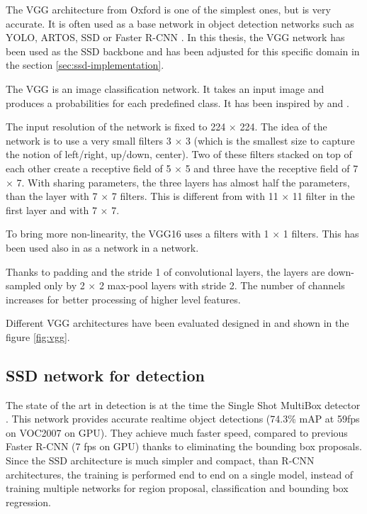 \documentclass[a4paper,12pt,titlepage, twoside]{article}
\numberwithin{figure}{section}
\begin{document}
The VGG\cite{simonyan2014very} architecture from Oxford is one of the simplest ones, but is very accurate. It is often used as a base network in object detection networks such as YOLO\cite{redmon2016you}, ARTOS\cite{barz2017fast}, SSD \cite{liu2016ssd} or Faster R-CNN \cite{faster-rcnn}. In this thesis, the VGG network has been used as the SSD backbone and has been adjusted for this specific domain in the section \ref{sec:ssd-implementation}. 

The VGG is an image classification network. It takes an input image and produces a probabilities for each predefined class. It has been inspired by \cite{ciresan2011flexible} and \cite{krizhevsky2012imagenet}.

The input resolution of the network is fixed to 224 $\times$ 224. The idea of the network is to use a very small filters 3 $\times$ 3  (which is the smallest size to capture the notion of left/right, up/down, center)\cite{simonyan2014very}. Two of these filters stacked on top of each other create a receptive field of 5 $\times$ 5 and three have the receptive field of 7 $\times$ 7. With sharing parameters, the three layers has almost half the parameters, than the layer with 7 $\times$ 7 filters. This is different from \cite{krizhevsky2012imagenet} with 11 $\times$ 11 filter in the first layer and \cite{zeiler2014visualizing} with 7 $\times$ 7.

To bring more non-linearity, the VGG16 uses a filters with 1 $\times$ 1 filters. This has been used also in \cite{lecun1989backpropagation} as a network in a network.

Thanks to padding and the stride 1 of convolutional layers, the layers are down-sampled only by 2 $\times$ 2 max-pool layers with stride 2. The number of channels increases for better processing of higher level features. 

Different VGG architectures have been evaluated designed in \cite{simonyan2014very} and shown in the figure \ref{fig:vgg}. 



\subsection{SSD network for detection}
\label{sec:ssd}

The state of the art in detection is at the time the Single Shot MultiBox detector \cite{liu2016ssd}. This network provides accurate realtime object detections (74.3\% mAP at 59fps on VOC2007 on GPU). They achieve much faster speed, compared to previous Faster R-CNN (7 fps on GPU) thanks to eliminating the bounding box proposals. Since the SSD architecture is much simpler and compact, than R-CNN architectures, the training is performed end to end on a single model, instead of training multiple networks for region proposal, classification and bounding box regression.
\end{document}
